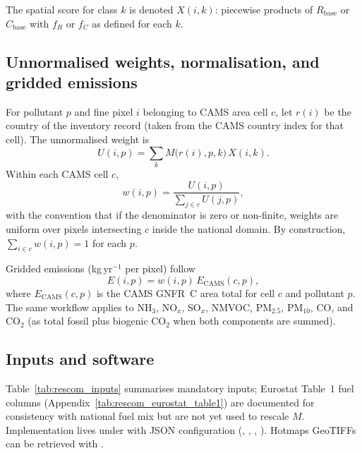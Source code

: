 The spatial score for class $k$ is denoted $X(i,k)$: piecewise products of
$R_{\mathrm{base}}$ or $C_{\mathrm{base}}$ with $f_R$ or $f_C$ as defined for
each $k$.

\subsection{Unnormalised weights, normalisation, and gridded emissions}

For pollutant $p$ and fine pixel $i$ belonging to CAMS area cell $c$, let
$r(i)$ be the country of the inventory record (taken from the CAMS country
index for that cell). The unnormalised weight is
\begin{equation}
  U(i,p) = \sum_{k} M\bigl(r(i),p,k\bigr)\, X(i,k).
\end{equation}
Within each CAMS cell $c$,
\begin{equation}
  w(i,p) = \frac{U(i,p)}{\displaystyle\sum_{j \in c} U(j,p)},
\end{equation}
with the convention that if the denominator is zero or non-finite, weights are
uniform over pixels intersecting $c$ inside the national domain. By construction,
$\sum_{i \in c} w(i,p)=1$ for each $p$.

Gridded emissions (kg\,yr$^{-1}$ per pixel) follow
\begin{equation}
  E(i,p) = w(i,p)\, E_{\mathrm{CAMS}}(c,p),
\end{equation}
where $E_{\mathrm{CAMS}}(c,p)$ is the CAMS GNFR~C area total for cell $c$ and
pollutant $p$. The same workflow applies to NH$_3$, NO$_x$, SO$_x$, NMVOC,
PM$_{2.5}$, PM$_{10}$, CO, and CO$_2$ (as total fossil plus biogenic CO$_2$
when both components are summed).

\subsection{Inputs and software}

Table~\ref{tab:rescom_inputs} summarises mandatory inputs; Eurostat Table~1 fuel
columns (Appendix~\ref{tab:rescom_eurostat_table1}) are documented for
consistency with national fuel mix but are not yet used to rescale $M$.
Implementation lives under  with JSON
configuration (,
,
,
). Hotmaps GeoTIFFs can be
retrieved with .

